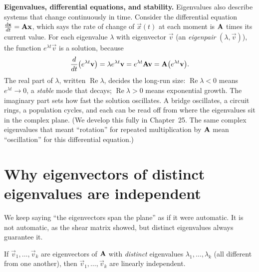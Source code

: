 \begin{connectionbox}
\textbf{Eigenvalues, differential equations, and stability.} Eigenvalues also
describe systems that change continuously in time. Consider the differential
equation $\frac{d\mathbf{x}}{dt}=\mathbf{A}\mathbf{x}$, which says the rate of change of
$\vec{x}(t)$ at each moment is $\mathbf{A}$ times its current value. For each
eigenvalue $\lambda$ with eigenvector $\vec{v}$ (an \emph{eigenpair}
$(\lambda,\vec{v})$), the function $e^{\lambda t}\vec{v}$ is a solution, because
\[
  \frac{d}{dt}\bigl(e^{\lambda t}\mathbf{v}\bigr)=\lambda e^{\lambda t}\mathbf{v}
  =e^{\lambda t}\mathbf{A}\mathbf{v}=\mathbf{A}\bigl(e^{\lambda t}\mathbf{v}\bigr).
\]
The real part of $\lambda$, written $\operatorname{Re}\lambda$, decides the long-run
size: $\operatorname{Re}\lambda<0$ means $e^{\lambda t}\to 0$, a \emph{stable} mode
that decays; $\operatorname{Re}\lambda>0$ means exponential growth. The imaginary
part sets how fast the solution oscillates. A bridge
oscillates, a circuit rings, a population cycles, and each can be read off from where the
eigenvalues sit in the complex plane. (We develop this fully in Chapter~25.
The same complex eigenvalues that meant ``rotation'' for repeated multiplication
by $\mathbf{A}$ mean ``oscillation'' for this differential equation.)
\end{connectionbox}

\section{Why eigenvectors of distinct eigenvalues are independent}
\label{ch23:independence}

We keep saying ``the eigenvectors span the plane'' as if it were automatic. It is
not automatic, as the shear matrix showed, but distinct eigenvalues always guarantee it.

\begin{theorem}
\label{ch23:thm-indep}
If $\vec{v}_1,\dots,\vec{v}_k$ are eigenvectors of $\mathbf{A}$ with \emph{distinct}
eigenvalues $\lambda_1,\dots,\lambda_k$ (all different from one another), then
$\vec{v}_1,\dots,\vec{v}_k$ are linearly independent.
\end{theorem}

